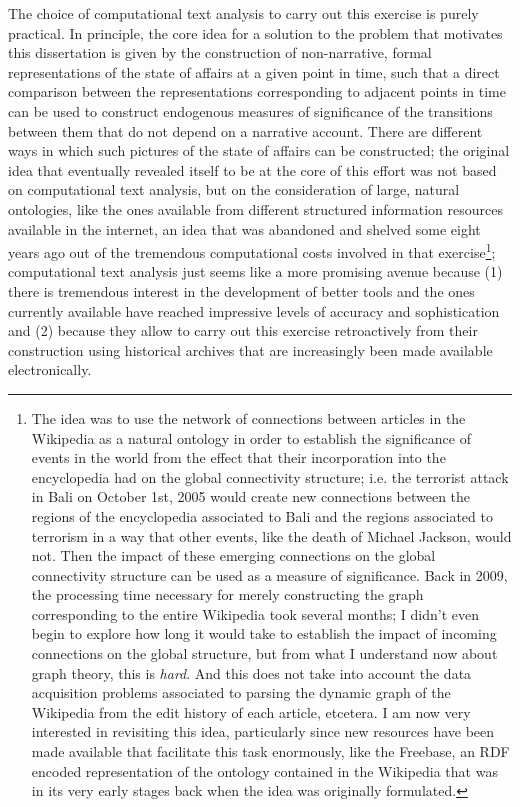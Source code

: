The choice of computational text analysis to carry out this exercise is purely practical.
In principle, the core idea for a solution to the problem that motivates this dissertation is given by the construction of non-narrative, formal representations of the state of affairs at a given point in time, such that a direct comparison between the representations corresponding to adjacent points in time can be used to construct endogenous measures of significance of the transitions between them that do not depend on a narrative account.
There are different ways in which such pictures of the state of affairs can be constructed; the original idea that eventually revealed itself to be at the core of this effort was not based on computational text analysis, but on the consideration of large, natural ontologies, like the ones available from different structured information resources available in the internet, an idea that was abandoned and shelved some eight years ago out of the tremendous computational costs involved in that exercise\footnote{
    The idea was to use the network of connections between articles in the Wikipedia as a natural ontology in order to establish the significance of events in the world from the effect that their incorporation into the encyclopedia had on the global connectivity structure; i.e. the terrorist attack in Bali on October 1st, 2005 would create new connections between the regions of the encyclopedia associated to Bali and the regions associated to terrorism in a way that other events, like the death of Michael Jackson, would not.
    Then the impact of these emerging connections on the global connectivity structure can be used as a measure of significance.
    Back in 2009, the processing time necessary for merely constructing the graph corresponding to the entire Wikipedia took several months; I didn't even begin to explore how long it would take to establish the impact of incoming connections on the global structure, but from what I understand now about graph theory, this is \emph{hard}.
    And this does not take into account the data acquisition problems associated to parsing the dynamic graph of the Wikipedia from the edit history of each article, etcetera.
    I am now very interested in revisiting this idea, particularly since new resources have been made available that facilitate this task enormously, like the Freebase, an RDF encoded representation of the ontology contained in the Wikipedia that was in its very early stages back when the idea was originally formulated.
}; computational text analysis just seems like a more promising avenue because (1) there is tremendous interest in the development of better tools and the ones currently available have reached impressive levels of accuracy and sophistication and (2) because they allow to carry out this exercise retroactively from their construction using historical archives that are increasingly been made available electronically.

